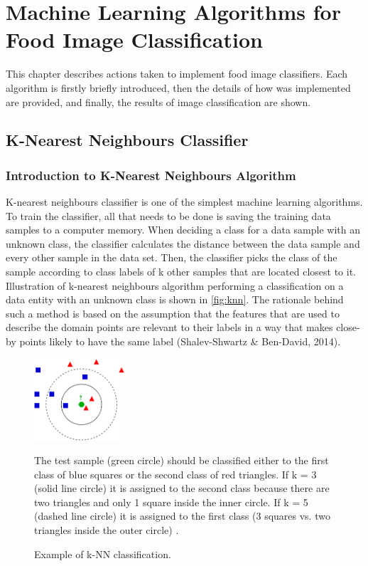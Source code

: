 \chapter{Machine Learning Algorithms for Food Image Classification}
This chapter describes actions taken to implement food image classifiers. Each algorithm is firstly briefly introduced, then the details of how was implemented are provided, and finally, the results of image classification are shown.

\section{K-Nearest Neighbours Classifier}

\subsection{Introduction to K-Nearest Neighbours Algorithm}
K-nearest neighbours classifier is one of the simplest machine learning algorithms. To train the classifier, all that needs to be done is saving the training data samples to a computer memory. When deciding a class for a data sample with an unknown class, the classifier calculates the distance between the data sample and every other sample in the data set. Then, the classifier picks the class of the sample according to class labels of k other samples that are located closest to it. Illustration of k-nearest neighbours algorithm performing a classification on a data entity with an unknown class is shown in \autoref{fig:knn}. The rationale behind such a method is based on the assumption that the features that are used to describe the domain points are relevant to their labels in a way that makes close-by points likely to have the same label (Shalev-Shwartz \& Ben-David, 2014). 


\begin{figure}[h]
\centering
\includegraphics[width=0.3\textwidth]{Figures/knn.png}
\caption{Example of k-NN classification. }
The test sample (green circle) should be classified either to the first class of blue squares or the second class of red triangles. If k = 3 (solid line circle) it is assigned to the second class because there are two triangles and only 1 square inside the inner circle. If k = 5 (dashed line circle) it is assigned to the first class (3 squares vs. two triangles inside the outer circle) \citep{wikipedia_2017}.
\label{fig:knn}
\end{figure}


